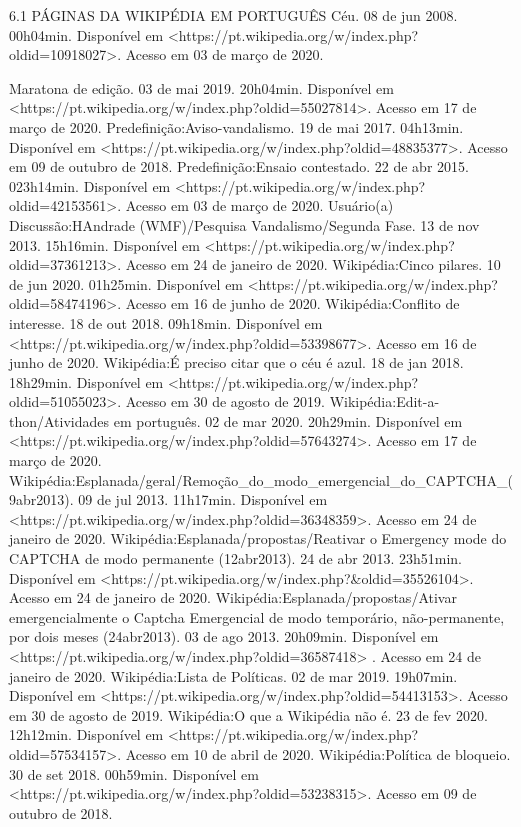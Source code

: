 6.1 PÁGINAS DA WIKIPÉDIA EM PORTUGUÊS
Céu. 08 de jun 2008. 00h04min. Disponível em <https://pt.wikipedia.org/w/index.php?oldid=10918027>. Acesso em 03 de março de 2020.

Maratona de edição. 03 de mai 2019. 20h04min. Disponível em <https://pt.wikipedia.org/w/index.php?oldid=55027814>. Acesso em 17 de março de 2020.
Predefinição:Aviso-vandalismo. 19 de mai 2017. 04h13min. Disponível em <https://pt.wikipedia.org/w/index.php?oldid=48835377>. Acesso em 09 de outubro de 2018.
Predefinição:Ensaio contestado. 22 de abr 2015. 023h14min. Disponível em <https://pt.wikipedia.org/w/index.php?oldid=42153561>. Acesso em 03 de março de 2020.
Usuário(a) Discussão:HAndrade (WMF)/Pesquisa Vandalismo/Segunda Fase. 13 de nov 2013. 15h16min. Disponível em <https://pt.wikipedia.org/w/index.php?oldid=37361213>. Acesso em 24 de janeiro de 2020.
Wikipédia:Cinco pilares. 10 de jun 2020. 01h25min. Disponível em <https://pt.wikipedia.org/w/index.php?oldid=58474196>. Acesso em 16 de junho de 2020.
Wikipédia:Conflito de interesse. 18 de out 2018. 09h18min. Disponível em <https://pt.wikipedia.org/w/index.php?oldid=53398677>. Acesso em 16 de junho de 2020.
Wikipédia:É preciso citar que o céu é azul. 18 de jan 2018. 18h29min. Disponível em <https://pt.wikipedia.org/w/index.php?oldid=51055023>. Acesso em 30 de agosto de 2019.
Wikipédia:Edit-a-thon/Atividades em português.  02 de mar 2020. 20h29min. Disponível em <https://pt.wikipedia.org/w/index.php?oldid=57643274>. Acesso em 17 de março de 2020.
Wikipédia:Esplanada/geral/Remoção_do_modo_emergencial_do_CAPTCHA_(9abr2013). 09 de jul 2013. 11h17min. Disponível em <https://pt.wikipedia.org/w/index.php?oldid=36348359>. Acesso em 24 de janeiro de 2020.
Wikipédia:Esplanada/propostas/Reativar o Emergency mode do CAPTCHA de modo permanente (12abr2013). 24 de abr 2013. 23h51min. Disponível em <https://pt.wikipedia.org/w/index.php?&oldid=35526104>. Acesso em 24 de janeiro de 2020.
Wikipédia:Esplanada/propostas/Ativar emergencialmente o Captcha Emergencial de modo temporário, não-permanente, por dois meses (24abr2013). 03 de ago 2013. 20h09min. Disponível em <https://pt.wikipedia.org/w/index.php?oldid=36587418> . Acesso em 24 de janeiro de 2020.
Wikipédia:Lista de Políticas. 02 de mar 2019. 19h07min. Disponível em <https://pt.wikipedia.org/w/index.php?oldid=54413153>. Acesso em 30 de agosto de 2019.
Wikipédia:O que a Wikipédia não é. 23 de fev 2020. 12h12min. Disponível em <https://pt.wikipedia.org/w/index.php?oldid=57534157>. Acesso em 10 de abril de 2020.
Wikipédia:Política de bloqueio. 30 de set 2018. 00h59min. Disponível em <https://pt.wikipedia.org/w/index.php?oldid=53238315>. Acesso em 09 de outubro de 2018.
